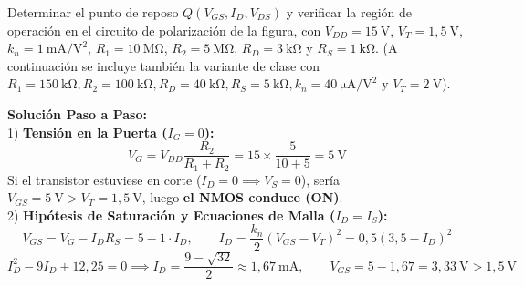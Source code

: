 \begin{ejercicio}
Determinar el punto de reposo $Q(V_{GS}, I_D, V_{DS})$ y verificar la región de operación en el circuito de polarización de la figura, con $V_{DD} = 15\ \si{\volt}$, $V_T = 1{,}5\ \si{\volt}$, $k_n = 1\ \si{\milli\ampere\per\volt\squared}$, $R_1 = 10\ \si{\mega\ohm}$, $R_2 = 5\ \si{\mega\ohm}$, $R_D = 3\ \si{\kilo\ohm}$ y $R_S = 1\ \si{\kilo\ohm}$. (A continuación se incluye también la variante de clase con $R_1 = 150\ \si{\kilo\ohm}, R_2 = 100\ \si{\kilo\ohm}, R_D = 40\ \si{\kilo\ohm}, R_S = 5\ \si{\kilo\ohm}, k_n = 40\ \si{\micro\ampere\per\volt\squared}$ y $V_T = 2\ \si{\volt}$).
\tcbline
\begin{center}
\end{center}
\textbf{Solución Paso a Paso:}\\[4pt]
1) \textbf{Tensión en la Puerta ($I_G = 0$):}
\begin{equation}
    V_G = V_{DD} \frac{R_2}{R_1 + R_2} = 15 \times \frac{5}{10 + 5} = 5\ \si{\volt}
\end{equation}
Si el transistor estuviese en corte ($I_D = 0 \implies V_S = 0$), sería $V_{GS} = 5\ \si{\volt} > V_T = 1{,}5\ \si{\volt}$, luego \textbf{el NMOS conduce (ON)}.\\[3pt]
2) \textbf{Hipótesis de Saturación y Ecuaciones de Malla ($I_D = I_S$):}
\begin{equation}
    V_{GS} = V_G - I_D R_S = 5 - 1 \cdot I_D, \qquad I_D = \frac{k_n}{2}(V_{GS} - V_T)^2 = 0{,}5(3{,}5 - I_D)^2
\end{equation}
\begin{equation}
    I_D^2 - 9 I_D + 12{,}25 = 0 \implies I_D = \frac{9 - \sqrt{32}}{2} \approx 1{,}67\ \si{\milli\ampere}, \qquad V_{GS} = 5 - 1{,}67 = 3{,}33\ \si{\volt} > 1{,}5\ \si{\volt}

\end{equation}
\end{ejercicio}
